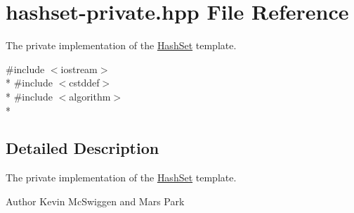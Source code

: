 \hypertarget{hashset-private_8hpp}{\section{hashset-\/private.hpp File Reference}
\label{hashset-private_8hpp}
}


The private implementation of the \hyperlink{class_hash_set}{Hash\-Set} template.  


{\ttfamily \#include $<$iostream$>$}\\*
{\ttfamily \#include $<$cstddef$>$}\\*
{\ttfamily \#include $<$algorithm$>$}\\*


\subsection{Detailed Description}
The private implementation of the \hyperlink{class_hash_set}{Hash\-Set} template. \begin{DoxyAuthor}{Author}
Kevin Mc\-Swiggen and Mars Park 
\end{DoxyAuthor}
